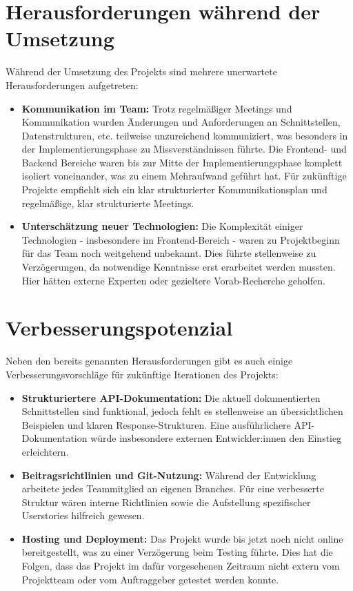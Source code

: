 \newpage

\section{Herausforderungen während der Umsetzung}

Während der Umsetzung des Projekts sind mehrere unerwartete Herausforderungen aufgetreten:

\begin{itemize}
    \item \textbf{Kommunikation im Team:} Trotz regelmäßiger Meetings und Kommunikation wurden Änderungen und Anforderungen an Schnittstellen, Datenstrukturen, etc. teilweise unzureichend kommuniziert, was besonders in der Implementierungsphase zu Missverständnissen führte. Die Frontend- und Backend Bereiche waren bis zur Mitte der Implementierungsphase komplett isoliert voneinander, was zu einem Mehraufwand geführt hat. Für zukünftige Projekte empfiehlt sich ein klar strukturierter Kommunikationsplan und regelmäßige, klar strukturierte Meetings.
    
    \item \textbf{Unterschätzung neuer Technologien:} Die Komplexität einiger Technologien - insbesondere im Frontend-Bereich - waren zu Projektbeginn für das Team noch weitgehend unbekannt. Dies führte stellenweise zu Verzögerungen, da notwendige Kenntnisse erst erarbeitet werden mussten. Hier hätten externe Experten oder gezieltere Vorab-Recherche geholfen.
\end{itemize}

\section{Verbesserungspotenzial}

Neben den bereits genannten Herausforderungen gibt es auch einige Verbesserungsvorschläge für zukünftige Iterationen des Projekts:

\begin{itemize}
    \item \textbf{Strukturiertere API-Dokumentation:} Die aktuell dokumentierten Schnittstellen sind funktional, jedoch fehlt es stellenweise an übersichtlichen Beispielen und klaren Response-Strukturen. Eine ausführlichere API-Dokumentation würde insbesondere externen Entwickler:innen den Einstieg erleichtern.
    
    \item \textbf{Beitragsrichtlinien und Git-Nutzung:} Während der Entwicklung arbeitete jedes Teammitglied an eigenen Branches. Für eine verbesserte Struktur wären interne Richtlinien sowie die Aufstellung spezifischer Userstories hilfreich gewesen.
    
    \item \textbf{Hosting und Deployment:} Das Projekt wurde bis jetzt noch nicht online bereitgestellt, was zu einer Verzögerung beim Testing führte. Dies hat die Folgen, dass das Projekt im dafür vorgesehenen Zeitraum nicht extern vom Projektteam oder vom Auftraggeber getestet werden konnte.
\end{itemize} \cite{prompt-gpt-write-retrospektive}

